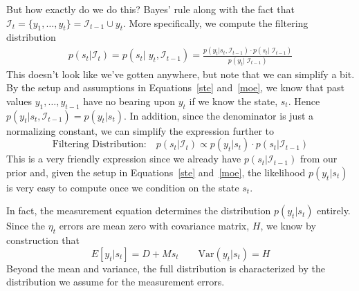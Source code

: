 \documentclass[a4paper,12pt]{article}
\begin{document}
But how exactly do we do this? Bayes' rule along with the fact that
$\mathcal{I}_{t} = \{y_1, \ldots, y_t\}=\mathcal{I}_{t-1} \cup y_t$.
More specifically, we compute the filtering distribution
\begin{align*}
  p(s_t | \mathcal{I}_{t}) =
  p(s_t | \; y_t, \mathcal{I}_{t-1}) =
  \frac{p(y_t | s_t, \mathcal{I}_{t-1})
    \cdot p(s_t|\; \mathcal{I}_{t-1})
  }{p(y_t | \; \mathcal{I}_{t-1})}
\end{align*}
This doesn't look like we've gotten anywhere, but note that we can
simplify a bit. By the setup and assumptions in Equations~\ref{ste}
and~\ref{moe}, we know that past values $y_1, \ldots, y_{t-1}$ have no
bearing upon $y_t$ if we know the state, $s_t$. Hence $p(y_t|s_t,
\mathcal{I}_{t-1}) = p(y_t|s_t)$. In addition, since the denominator is
just a normalizing constant, we can simplify the expression further to
\begin{equation}
  \label{filt}
  \text{Filtering Distribution:} \quad
  p(s_t | \mathcal{I}_{t}) \propto p(y_t | s_t) \cdot
  p(s_t |\mathcal{I}_{t-1})
\end{equation}
This is a very friendly expression since we already have $p(s_t |
\mathcal{I}_{t-1})$ from our prior and, given the setup in
Equations~\ref{ste} and~\ref{moe}, the likelihood $p(y_t|s_t)$ is very
easy to compute once we condition on the state $s_t$.

In fact, the measurement equation determines the distribution
$p(y_t|s_t)$ entirely. Since the $\eta_t$ errors are mean zero with
covariance matrix, $H$, we know by construction that
\[
  E[y_t|s_t] = D + M s_t
  \qquad
  \text{Var}(y_t|s_t) = H
\]
Beyond the mean and variance, the full distribution is characterized by
the distribution we assume for the measurement errors.
\end{document}
